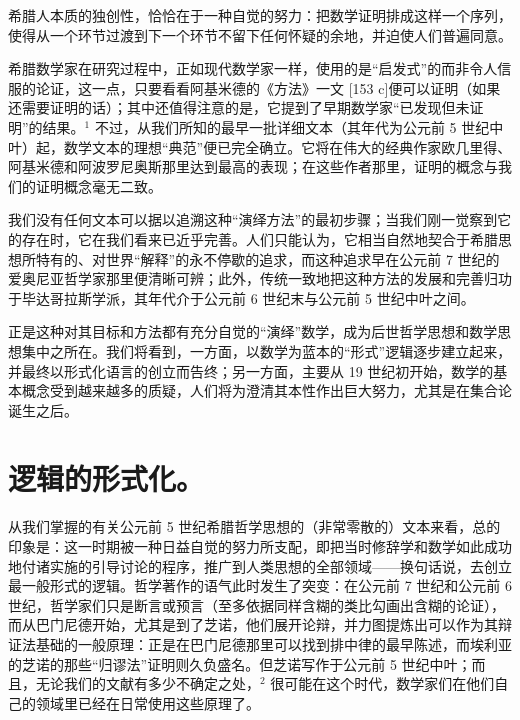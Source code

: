 希腊人本质的独创性，恰恰在于一种自觉的努力：把数学证明排成这样一个序列，使得从一个环节过渡到下一个环节不留下任何怀疑的余地，并迫使人们普遍同意。

希腊数学家在研究过程中，正如现代数学家一样，使用的是“启发式”的而非令人信服的论证，这一点，只要看看阿基米德的《方法》一文 {[}153 c{]}便可以证明（如果还需要证明的话）；其中还值得注意的是，它提到了早期数学家“已发现但未证明”的结果。\(^{1}\) 不过，从我们所知的最早一批详细文本（其年代为公元前 5 世纪中叶）起，数学文本的理想“典范”便已完全确立。它将在伟大的经典作家欧几里得、阿基米德和阿波罗尼奥斯那里达到最高的表现；在这些作者那里，证明的概念与我们的证明概念毫无二致。

我们没有任何文本可以据以追溯这种“演绎方法”的最初步骤；当我们刚一觉察到它的存在时，它在我们看来已近乎完善。人们只能认为，它相当自然地契合于希腊思想所特有的、对世界“解释”的永不停歇的追求，而这种追求早在公元前 7 世纪的爱奥尼亚哲学家那里便清晰可辨；此外，传统一致地把这种方法的发展和完善归功于毕达哥拉斯学派，其年代介于公元前 6 世纪末与公元前 5 世纪中叶之间。

正是这种对其目标和方法都有充分自觉的“演绎”数学，成为后世哲学思想和数学思想集中之所在。我们将看到，一方面，以数学为蓝本的“形式”逻辑逐步建立起来，并最终以形式化语言的创立而告终；另一方面，主要从 19 世纪初开始，数学的基本概念受到越来越多的质疑，人们将为澄清其本性作出巨大努力，尤其是在集合论诞生之后。

\section*{逻辑的形式化。}
{}

从我们掌握的有关公元前 5 世纪希腊哲学思想的（非常零散的）文本来看，总的印象是：这一时期被一种日益自觉的努力所支配，即把当时修辞学和数学如此成功地付诸实施的引导讨论的程序，推广到人类思想的全部领域——换句话说，去创立最一般形式的逻辑。哲学著作的语气此时发生了突变：在公元前 7 世纪和公元前 6 世纪，哲学家们只是断言或预言（至多依据同样含糊的类比勾画出含糊的论证），而从巴门尼德开始，尤其是到了芝诺，他们展开论辩，并力图提炼出可以作为其辩证法基础的一般原理：正是在巴门尼德那里可以找到排中律的最早陈述，而埃利亚的芝诺的那些“归谬法”证明则久负盛名。但芝诺写作于公元前 5 世纪中叶；而且，无论我们的文献有多少不确定之处，\(^{2}\) 很可能在这个时代，数学家们在他们自己的领域里已经在日常使用这些原理了。


